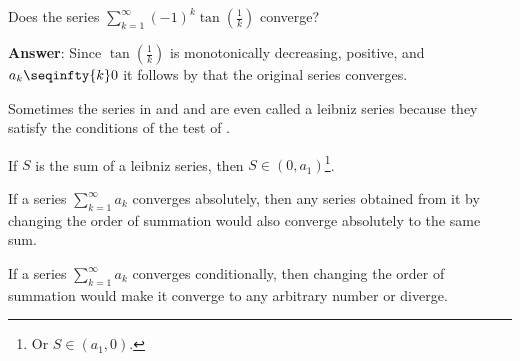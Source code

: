 \begin{exm}\label{exm-leibniz-test:3}
	Does the series $\sum_{k=1}^\infty (-1)^k \tan\left(\frac{1}{k}\right)$ converge?
	\begin{flushleft}
		\textbf{Answer}: Since $\tan\left(\tfrac{1}{k}\right)$ is monotonically decreasing,
		positive, and $a_k \seqinfty{k} 0$ it follows by 
		that the original series converges.
	\end{flushleft}
\end{exm}

\begin{rem}\label{rem-leibniz-test:1}
	Sometimes the series in  and 
	and  are even called a leibniz series because
	they satisfy the conditions of the test of .
\end{rem}

\begin{rem}\label{rem-leibniz-test:2}
	If $S$ is the sum of a leibniz series, then $S\in(0,a_1)$\footnote{Or  $S\in(a_1,0)$.}.
\end{rem}

\begin{thm}\label{thm-general-series-converges-absolutely-change-order}
	If a series $\sum_{k=1}^\infty a_k$ converges absolutely, then any series
	obtained from it by changing the order of summation would also converge absolutely
	to the same sum.
\end{thm}

\begin{thm}\label{thm-general-series-converges-conditionally-dont-change-order}
	If a series $\sum_{k=1}^\infty a_k$ converges conditionally, then changing the
	order of summation would make it converge to any arbitrary number or diverge.
\end{thm}

